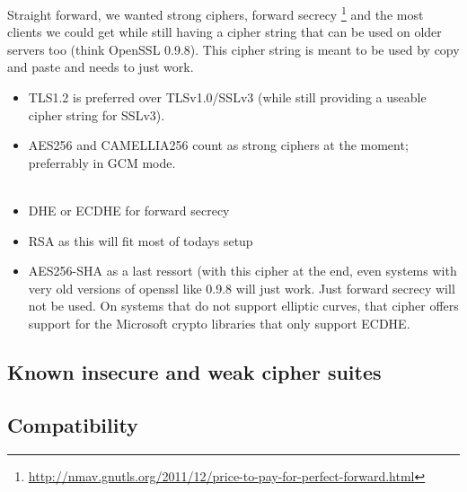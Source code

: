 Straight forward, we wanted strong ciphers, forward secrecy
\footnote{\url{http://nmav.gnutls.org/2011/12/price-to-pay-for-perfect-forward.html}}
and the most clients we could get while still having a cipher string that can be
used on older servers too (think OpenSSL 0.9.8). This cipher string is meant to be used
by copy and paste and needs to just work.

\begin{itemize}
\item TLS1.2 is preferred over TLSv1.0/SSLv3 (while still providing a useable cipher
      string for SSLv3).
\item AES256 and CAMELLIA256 count as strong ciphers at the moment; preferrably in
      GCM mode.\\
       \\
\item DHE or ECDHE for forward secrecy
\item RSA as this will fit most of todays setup
\item AES256-SHA as a last ressort (with this cipher at the end, even systems with
      very old versions of openssl like 0.9.8 will just work. Just forward secrecy
      will not be used. On systems that do not support elliptic curves, that cipher
      offers support for the Microsoft crypto libraries that only support ECDHE.
\end{itemize}



\subsection{Known insecure and weak cipher suites}

\subsection{Compatibility}


